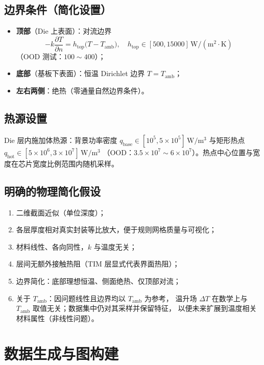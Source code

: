 \documentclass[11pt,a4paper]{article}
\begin{document}
\subsection{边界条件（简化设置）}
\begin{itemize}[leftmargin=1.5em]
  \item \textbf{顶部}（Die 上表面）：对流边界
  \[
  -k\frac{\partial T}{\partial n}=h_{\mathrm{top}}\big(T-T_{\mathrm{amb}}\big),
  \quad h_{\mathrm{top}}\in[500,15000]\,\mathrm{W/(m^2\cdot K)}
  \]
  （OOD 测试：\(100\sim 400\)）；
  \item \textbf{底部}（基板下表面）：恒温 Dirichlet 边界 \(T=T_{\mathrm{amb}}\)；
  \item \textbf{左右两侧}：绝热（零通量自然边界条件）。
\end{itemize}

\subsection{热源设置}
Die 层内施加体热源：背景功率密度 \(q_{\mathrm{base}}\in[10^5,5\times 10^5]\,\mathrm{W/m^3}\)
与矩形热点 \(q_{\mathrm{hot}}\in[5\times 10^6,3\times 10^7]\,\mathrm{W/m^3}\)
（OOD：\(3.5\times 10^7\sim 6\times 10^7\)）。热点中心位置与宽度在芯片宽度比例范围内随机采样。

\subsection{明确的物理简化假设}
\begin{enumerate}[leftmargin=1.5em]
  \item 二维截面近似（单位深度）；
  \item 各层厚度相对真实封装等比放大，便于规则网格质量与可视化；
  \item 材料线性、各向同性，\(k\) 与温度无关；
  \item 层间无额外接触热阻（TIM 层显式代表界面热阻）；
  \item 边界简化：底部理想恒温、侧面绝热、仅顶部对流；
  \item 关于 \(T_{\mathrm{amb}}\)：因问题线性且边界均以 \(T_{\mathrm{amb}}\) 为参考，
  温升场 \(\Delta T\) 在数学上与 \(T_{\mathrm{amb}}\) 取值无关；数据集中仍对其采样并保留特征，
  以便未来扩展到温度相关材料属性（非线性问题）。
\end{enumerate}


\section{数据生成与图构建}
\end{document}
